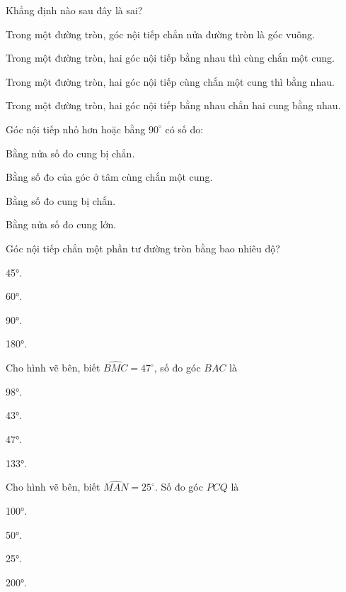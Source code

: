 \documentclass[%
    fontsize=12pt,%
    chapterprefix=false,%
    open=right,%
    twoside=false,%
    numbers=noenddot,%
    headings=optiontohead,%
    final,%
    DIV=15,%
    parskip=half %
]{scrbook}
\begin{document}
\begin{tracnghiem}

\item Khẳng định nào sau đây là sai?
\begin{options}
  \item Trong một đường tròn, góc nội tiếp chắn nửa đường tròn là góc vuông.
  \item Trong một đường tròn, hai góc nội tiếp bằng nhau thì cùng chắn một cung.
  \item Trong một đường tròn, hai góc nội tiếp cùng chắn một cung thì bằng nhau.
  \item Trong một đường tròn, hai góc nội tiếp bằng nhau chắn hai cung bằng nhau.
\end{options}

\item Góc nội tiếp nhỏ hơn hoặc bằng $ 90^\circ $ có số đo:
\begin{options}
  \item Bằng nửa số đo cung bị chắn.
  \item Bằng số đo của góc ở tâm cùng chắn một cung.
  \item Bằng số đo cung bị chắn.
  \item Bằng nửa số đo cung lớn.
\end{options}

\item Góc nội tiếp chắn một phần tư đường tròn bằng bao nhiêu độ?
\begin{options}
  \item 45°.
  \item 60°.
  \item 90°.
  \item 180°.
\end{options}

\item Cho hình vẽ bên, biết $ \widehat{BMC} = 47^\circ $, số đo góc $ BAC $ là
\begin{options}
  \item 98°.
  \item 43°.
  \item 47°.
  \item 133°.
\end{options}

\item Cho hình vẽ bên, biết $ \widehat{MAN} = 25^\circ $. Số đo góc $ PCQ $ là
\begin{options}
  \item 100°.
  \item 50°.
  \item 25°.
  \item 200°.
\end{options}


\end{tracnghiem}
\end{document}
